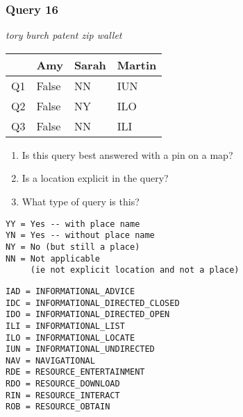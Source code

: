 \begin{frame}[fragile]
\frametitle{Query 16}
\vspace{1em}

\emph{tory burch patent zip wallet}

\vfill

\begin{table}
  \centering
  \begin{tabular}{ l l l l }
    & \textbf{Amy} & \textbf{Sarah} & \textbf{Martin}\\
    \toprule
    Q1 & False & NN & IUN\\
Q2 & False & NY & ILO\\
Q3 & False & NN & ILI\\
    \bottomrule
  \end{tabular}
\end{table}

\vfill

\tiny{

\begin{enumerate}
\item Is this query best answered with a pin on a map?
\item Is a location explicit in the query?
\item What type of query is this?
\end{enumerate}

\vfill

\begin{multicols}{2}
\begin{verbatim}
YY = Yes -- with place name
YN = Yes -- without place name
NY = No (but still a place)
NN = Not applicable 
     (ie not explicit location and not a place)
\end{verbatim}

\columnbreak
\begin{verbatim}
IAD = INFORMATIONAL_ADVICE
IDC = INFORMATIONAL_DIRECTED_CLOSED
IDO = INFORMATIONAL_DIRECTED_OPEN
ILI = INFORMATIONAL_LIST
ILO = INFORMATIONAL_LOCATE
IUN = INFORMATIONAL_UNDIRECTED
NAV = NAVIGATIONAL
RDE = RESOURCE_ENTERTAINMENT
RDO = RESOURCE_DOWNLOAD
RIN = RESOURCE_INTERACT
ROB = RESOURCE_OBTAIN
\end{verbatim}
\end{multicols}
}

\end{frame}


